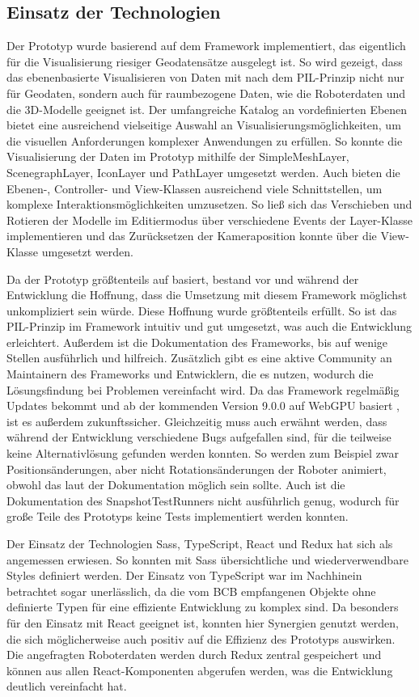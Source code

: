 \subsection{Einsatz der Technologien}
Der Prototyp wurde basierend auf dem Framework \deckgl{} implementiert, das eigentlich für die Visualisierung riesiger Geodatensätze ausgelegt ist. So wird gezeigt, dass das ebenenbasierte Visualisieren von Daten mit \deckgl{} nach dem \ac{PIL}-Prinzip nicht nur für Geodaten, sondern auch für raumbezogene Daten, wie die Roboterdaten und die 3D-Modelle geeignet ist. Der umfangreiche Katalog an vordefinierten Ebenen bietet eine ausreichend vielseitige Auswahl an Visualisierungsmöglichkeiten, um die visuellen Anforderungen komplexer Anwendungen zu erfüllen. So konnte die Visualisierung der Daten im Prototyp mithilfe der SimpleMeshLayer, ScenegraphLayer, IconLayer und PathLayer umgesetzt werden. Auch bieten die Ebenen-, Controller- und View-Klassen ausreichend viele Schnittstellen, um komplexe Interaktionsmöglichkeiten umzusetzen. So ließ sich das Verschieben und Rotieren der Modelle im Editiermodus über verschiedene Events der Layer-Klasse implementieren und das Zurücksetzen der Kameraposition konnte über die View-Klasse umgesetzt werden.

Da der Prototyp größtenteils auf \deckgl{} basiert, bestand vor und während der Entwicklung die Hoffnung, dass die Umsetzung mit diesem Framework möglichst unkompliziert sein würde. Diese Hoffnung wurde größtenteils erfüllt. So ist das \ac{PIL}-Prinzip im Framework intuitiv und gut umgesetzt, was auch die Entwicklung erleichtert. Außerdem ist die Dokumentation des Frameworks, bis auf wenige Stellen ausführlich und hilfreich. Zusätzlich gibt es eine aktive Community an Maintainern des Frameworks und Entwicklern, die es nutzen, wodurch die Lösungsfindung bei Problemen vereinfacht wird. Da das Framework regelmäßig Updates bekommt und ab der kommenden Version 9.0.0 auf WebGPU basiert \cite{Green2022}, ist es außerdem zukunftssicher. Gleichzeitig muss auch erwähnt werden, dass während der Entwicklung verschiedene Bugs aufgefallen sind, für die teilweise keine Alternativlösung gefunden werden konnten. So werden zum Beispiel zwar Positionsänderungen, aber nicht Rotationsänderungen der Roboter animiert, obwohl das laut der Dokumentation möglich sein sollte. Auch ist die Dokumentation des SnapshotTestRunners nicht ausführlich genug, wodurch für große Teile des Prototyps keine Tests implementiert werden konnten.

Der Einsatz der Technologien \ac{Sass}, TypeScript, React und Redux hat sich als angemessen erwiesen. So konnten mit \ac{Sass} übersichtliche und wiederverwendbare Styles definiert werden. Der Einsatz von TypeScript war im Nachhinein betrachtet sogar unerlässlich, da die vom \ac{BCB} empfangenen Objekte ohne definierte Typen für eine effiziente Entwicklung zu komplex sind. Da \deckgl{} besonders für den Einsatz mit React geeignet ist, konnten hier Synergien genutzt werden, die sich möglicherweise auch positiv auf die Effizienz des Prototyps auswirken. Die angefragten Roboterdaten werden durch Redux zentral gespeichert und können aus allen React-Komponenten abgerufen werden, was die Entwicklung deutlich vereinfacht hat.

